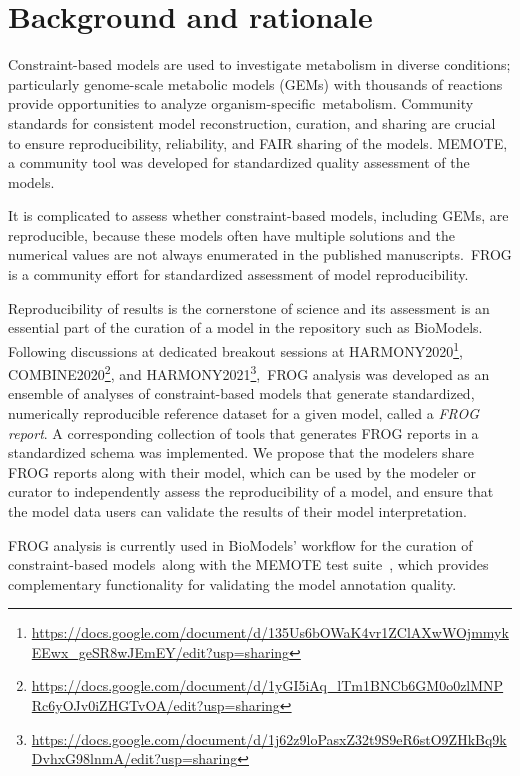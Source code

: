 \chapter{Background and rationale}

Constraint-based models are used to investigate metabolism in diverse conditions; particularly genome-scale metabolic models (GEMs) with thousands of reactions provide opportunities to analyze organism-specific metabolism. Community standards for consistent model reconstruction, curation, and sharing are crucial to ensure reproducibility, reliability, and FAIR sharing of the models. MEMOTE, a community tool was developed for standardized quality assessment of the models.

It is complicated to assess whether constraint-based models, including GEMs, are reproducible, because these models often have multiple solutions and the numerical values are not always enumerated in the published manuscripts. FROG is a community effort for standardized assessment of model reproducibility.

Reproducibility of results is the cornerstone of science and its assessment is an essential part of the curation of a model in the repository such as BioModels. Following discussions at dedicated breakout sessions at HARMONY2020\footnote{\url{https://docs.google.com/document/d/135Us6bOWaK4vr1ZClAXwWOjmmykEEwx_geSR8wJEmEY/edit?usp=sharing}}, COMBINE2020\footnote{\url{https://docs.google.com/document/d/1yGI5iAq_lTm1BNCb6GM0o0zlMNPRc6yOJv0iZHGTvOA/edit?usp=sharing}}, and HARMONY2021\footnote{\url{https://docs.google.com/document/d/1j62z9loPasxZ32t9S9eR6stO9ZHkBq9kDvhxG98lnmA/edit?usp=sharing}}, FROG analysis was developed as an ensemble of analyses of constraint-based models that generate standardized, numerically reproducible reference dataset for a given model, called a \emph{FROG report}. A corresponding collection of tools that generates FROG reports in a standardized schema was implemented. We propose that the modelers share FROG reports along with their model, which can be used by the modeler or curator to independently assess the reproducibility of a model, and ensure that the model data users can validate the results of their model interpretation.

FROG analysis is currently used in BioModels' workflow for the curation of constraint-based models along with the MEMOTE test suite~\cite{lieven2020memote}, which provides complementary functionality for validating the model annotation quality.

